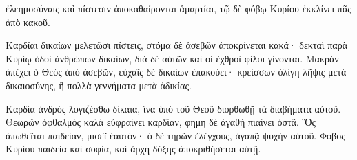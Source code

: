 {ἐλεημοσύναις καὶ πίστεσιν ἀποκαθαίρονται ἁμαρτίαι, τῷ δὲ φόβῳ Κυρίου ἐκκλίνει πᾶς ἀπὸ κακοῦ.
\par }{\PP {}Καρδίαι δικαίων μελετῶσι πίστεις, στόμα δὲ ἀσεβῶν ἀποκρίνεται κακά·
δεκταὶ παρὰ Κυρίῳ ὁδοὶ ἀνθρώπων δικαίων, διὰ δὲ αὐτῶν καὶ οἱ ἐχθροὶ φίλοι γίνονται.
Μακρὰν ἀπέχει ὁ Θεὸς ἀπὸ ἀσεβῶν, εὐχαῖς δὲ δικαίων ἐπακούει·
κρείσσων ὀλίγη λῆψις μετὰ δικαιοσύνης, ἢ πολλὰ γεννήματα μετὰ ἀδικίας.
\par }{\PP {}Καρδία ἀνδρὸς λογιζέσθω δίκαια, ἵνα ὑπὸ τοῦ Θεοῦ διορθωθῇ τὰ διαβήματα αὐτοῦ.
Θεωρῶν ὀφθαλμὸς καλὰ εὐφραίνει καρδίαν, φημη δὲ ἀγαθὴ πιαίνει ὀστᾶ.
Ὃς ἀπωθεῖται παιδείαν, μισεῖ ἑαυτὸν· ὁ δὲ τηρῶν ἐλέγχους, ἀγαπᾷ ψυχὴν αὐτοῦ.
Φόβος Κυρίου παιδεία καὶ σοφία, καὶ ἀρχὴ δόξης ἀποκριθήσεται αὐτῇ.

}
